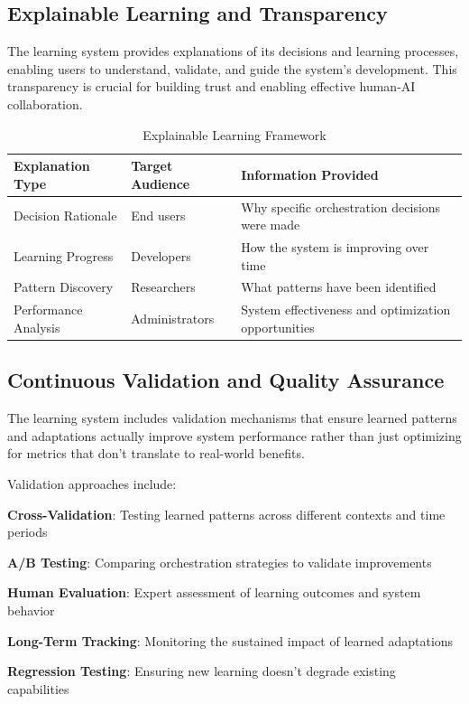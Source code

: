 \subsection*{Explainable Learning and Transparency}

The learning system provides explanations of its decisions and learning processes, enabling users to understand, validate, and guide the system's development. This transparency is crucial for building trust and enabling effective human-AI collaboration.

\begin{table}[ht]
\centering
\begin{tabular}{@{}lll@{}}
\toprule
\textbf{Explanation Type} & \textbf{Target Audience} & \textbf{Information Provided} \\
\midrule
Decision Rationale & End users & Why specific orchestration decisions were made \\
Learning Progress & Developers & How the system is improving over time \\
Pattern Discovery & Researchers & What patterns have been identified \\
Performance Analysis & Administrators & System effectiveness and optimization opportunities \\
\bottomrule
\end{tabular}
\caption{Explainable Learning Framework}
\end{table}

\subsection*{Continuous Validation and Quality Assurance}

The learning system includes validation mechanisms that ensure learned patterns and adaptations actually improve system performance rather than just optimizing for metrics that don't translate to real-world benefits.

Validation approaches include:

\begin{expandedlist}
    \item \textbf{Cross-Validation}: Testing learned patterns across different contexts and time periods
    \item \textbf{A/B Testing}: Comparing orchestration strategies to validate improvements
    \item \textbf{Human Evaluation}: Expert assessment of learning outcomes and system behavior
    \item \textbf{Long-Term Tracking}: Monitoring the sustained impact of learned adaptations
    \item \textbf{Regression Testing}: Ensuring new learning doesn't degrade existing capabilities
\end{expandedlist}

